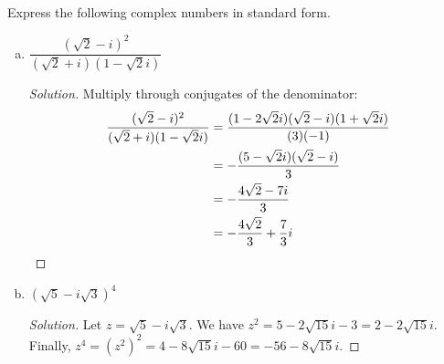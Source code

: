 
\question Express the following complex numbers in standard form.
\begin{enumerate}[(a)]
  \item $\dfrac{(\sqrt2-i)^2}{(\sqrt2+i)(1-\sqrt2i)}$
        \begin{proof}[Solution]
          Multiply through conjugates of the denominator:
          \begin{align*}
            \frac{(\sqrt2-i)^2}{(\sqrt2+i)(1-\sqrt2i)}
             & = \frac{(1-2\sqrt{2}i)(\sqrt{2}-i)(1+\sqrt{2}i)}{(3)(-1)} \\
             & = -\frac{(5-\sqrt2i)(\sqrt2-i)}{3}                        \\
             & = -\frac{4\sqrt2-7i}{3}                                   \\
             & = -\frac{4\sqrt2}{3}+\frac{7}{3}i \qedhere
          \end{align*}
        \end{proof}
  \item $(\sqrt5-i\sqrt3)^4$
        \begin{proof}[Solution]
          Let $z=\sqrt5-i\sqrt3$.
          We have $z^2 = 5 - 2\sqrt{15} i - 3 = 2 - 2\sqrt{15} i$.
          Finally, $z^4 = (z^2)^2 = 4 - 8\sqrt{15} i - 60 = -56 - 8\sqrt{15}i$.
        \end{proof}
\end{enumerate}

